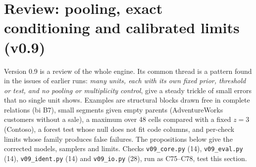 \section{Review: pooling, exact conditioning and calibrated limits (v0.9)}\label{sec:v09}
Version 0.9 is a review of the whole engine. Its common thread is a pattern found in the issues of earlier runs: \emph{many units, each with its own fixed prior, threshold or test, and no pooling or multiplicity control}, give a steady trickle of small errors that no single unit shows. Examples are structural blocks drawn free in complete relations (bi B7), small segments given empty parents (AdventureWorks customers without a sale), a maximum over 48 cells compared with a fixed $z=3$ (Contoso), a forest test whose null does not fit code columns, and per-check limits whose family produces false failures. The propositions below give the corrected models, samplers and limits. Checks \texttt{v09\_core.py} (14), \texttt{v09\_eval.py} (14), \texttt{v09\_ident.py} (14) and \texttt{v09\_io.py} (28), run as C75--C78, test this section.

